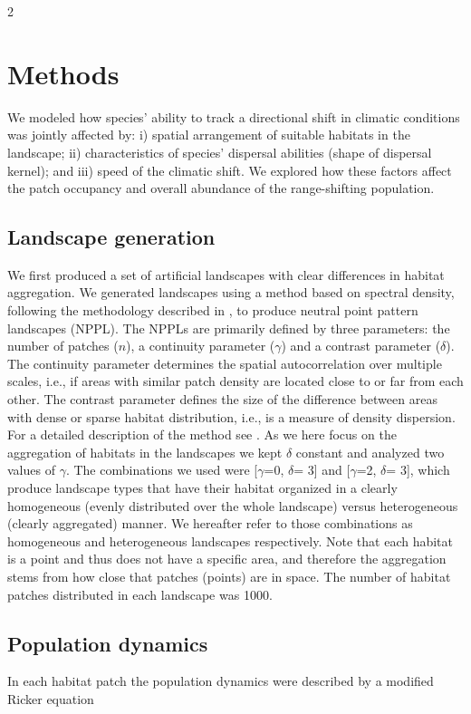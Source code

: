 \documentclass[12pt,pdftex]{article}
\begin{document}
\begin{spacing}{2}
\section*{Methods}

We modeled how species' ability to track a directional shift in climatic conditions was jointly affected by: i) spatial arrangement of suitable habitats in the landscape; ii) characteristics of species' dispersal abilities (shape of dispersal kernel); and iii) speed of the climatic shift. We explored how these factors affect the patch occupancy and overall abundance of the range-shifting population.

\subsection*{Landscape generation}			
We first produced a set of artificial landscapes with clear differences in habitat aggregation. We generated landscapes using a method based on spectral density, following the methodology described in \cite{Lindstrom2011}, to produce neutral point pattern landscapes (NPPL). The NPPLs are primarily defined by three parameters: the number of patches ($n$), a continuity parameter ($\gamma$) and a contrast parameter ($\delta$). The continuity parameter determines the spatial autocorrelation over multiple scales, i.e., if areas with similar patch density are located close to or far from each other. The contrast parameter defines the size of the difference between areas with dense or sparse habitat distribution, i.e., is a measure of density dispersion. For a detailed description of the method see \cite{Lindstrom2011}. As we here focus on the aggregation of habitats in the landscapes we kept  $\delta$ constant and analyzed two values of $\gamma$. The combinations we used were [$\gamma$=0, $\delta$= 3] and [$\gamma$=2, $\delta$= 3], which produce landscape types that have their habitat organized in a clearly homogeneous (evenly distributed over the whole landscape) versus heterogeneous (clearly aggregated) manner. We hereafter refer to those combinations as homogeneous and heterogeneous landscapes respectively. Note that each habitat is a point and thus does not have a specific area, and therefore the aggregation stems from how close that patches (points) are in space. The number of habitat patches distributed in each landscape was 1000.

\subsection*{Population dynamics}
In each habitat patch the population dynamics were described by a modified Ricker equation \citep{Ricker1954}


\end{spacing}
\end{document}
